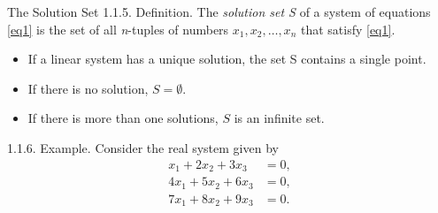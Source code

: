 \documentclass[smaller,hyperref={CJKbookmarks=true}]{beamer}
\newcommand{\myseries}[2]{$#1_1,#1_2,\dots,#1_#2$}
\begin{document}
\begin{frame}[t,shrink]{The Solution Set}
\alert{1.1.5. Definition.} The \emph{solution set S} of a system of equations \eqref{eq1} is the set of all \emph{n}-tuples of numbers \myseries{x}{n} that satisfy \eqref{eq1}.
\begin{itemize}
  \item If a linear system has a unique solution, the set S contains a single point.
  \item If there is no solution, $S=\emptyset.$
  \item If there is more than one solutions, $S$ is an infinite set.
\end{itemize}
\alert{1.1.6. Example.} Consider the real system given by
\begin{align*}
  x_1+2x_2+3x_3 &=0, \\
  4x_1+5x_2+6x_3 &=0, \\
  7x_1+8x_2+9x_3 &=0.
\end{align*}
\end{frame}
\end{document}
